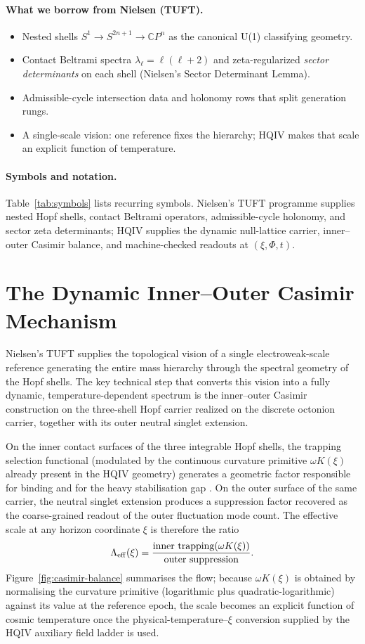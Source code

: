 \documentclass[11pt]{amsart}
\begin{document}
\paragraph{What we borrow from Nielsen (TUFT).}
\begin{itemize}[nosep]
\item Nested shells $S^1\to S^{2n+1}\to\mathbb{C}P^n$ as the canonical U(1) classifying geometry.
\item Contact Beltrami spectra $\lambda_\ell=\ell(\ell+2)$ and zeta-regularized \emph{sector determinants} on each shell (Nielsen's Sector Determinant Lemma).
\item Admissible-cycle intersection data and holonomy rows that split generation rungs.
\item A single-scale vision: one reference fixes the hierarchy; HQIV makes that scale an explicit function of temperature.
\end{itemize}

\paragraph{Symbols and notation.}
Table~\ref{tab:symbols} lists recurring symbols. Nielsen's TUFT programme \cite{NielsenTUFT2026} supplies nested Hopf shells, contact Beltrami operators, admissible-cycle holonomy, and sector zeta determinants; HQIV supplies the dynamic null-lattice carrier, inner--outer Casimir balance, and machine-checked readouts at $(\xi,\Phi,t)$.

\section{The Dynamic Inner--Outer Casimir Mechanism}

Nielsen's TUFT supplies the topological vision of a single electroweak-scale reference generating the entire mass hierarchy through the spectral geometry of the Hopf shells. The key technical step that converts this vision into a fully dynamic, temperature-dependent spectrum is the inner--outer Casimir construction on the three-shell Hopf carrier realized on the discrete octonion carrier, together with its outer neutral singlet extension.

On the inner contact surfaces of the three integrable Hopf shells, the trapping selection functional (modulated by the continuous curvature primitive $\omega K(\xi)$ already present in the HQIV geometry) generates a geometric factor responsible for binding and for the heavy stabilisation gap \cite{casimir1948}. On the outer surface of the same carrier, the neutral singlet extension produces a suppression factor recovered as the coarse-grained readout of the outer fluctuation mode count. The effective scale at any horizon coordinate $\xi$ is therefore the ratio
\[
\Lambda_{\rm eff}(\xi) = \frac{\text{inner trapping}(\omega K(\xi))}{\text{outer suppression}}.
\]
Figure~\ref{fig:casimir-balance} summarises the flow; because $\omega K(\xi)$ is obtained by normalising the curvature primitive (logarithmic plus quadratic-logarithmic) against its value at the reference epoch, the scale becomes an explicit function of cosmic temperature once the physical-temperature--$\xi$ conversion supplied by the HQIV auxiliary field ladder is used.
\end{document}
